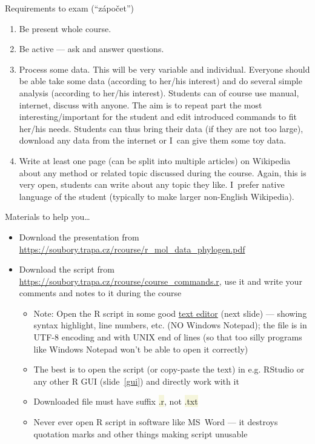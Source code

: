 \documentclass[compress, ucs, xelatex, 11pt, xcolor=svgnames, aspectratio=169,
	hyperref={
		bookmarks=true,
		unicode=true,
		colorlinks=true,
		pdftitle={Molecular data in R},
		plainpages=false,
		pdfauthor={Vojtech Zeisek},
		pdfsubject={Course about phylogeny and evolution in R},
		pdfcreator={XeLaTeX},
		pdfkeywords={R, evolution, phylogeny, molecular data},
		linkcolor=Crimson, %
		anchorcolor=Magenta, %
		citecolor=Magenta, %
		filecolor=Magenta, %
		menucolor=Magenta, %
		urlcolor=DodgerBlue, %
		pdftex},
	url={hyphens, lowtilde} %
	]{beamer}
\renewcommand{\texttt}[1]{\colorbox{Beige}{{\ttfamily #1}}}
\begin{document}
\begin{frame}{Requirements to exam (\enquote{zápočet})}
	\begin{enumerate}
		\item Be present whole course.
		\item Be active --- ask and answer questions.
		\item Process some data. This will be very variable and individual. Everyone should be able take some data (according to her/his interest) and do several simple analysis (according to her/his interest). Students can of course use manual, internet, discuss with anyone. The aim is to repeat part the most interesting/important for the student and edit introduced commands to fit her/his needs. Students can thus bring their data (if they are not too large), download any data from the internet or I~can give them some toy data.
		\item Write at least one page (can be split into multiple articles) on Wikipedia about any method or related topic discussed during the course. Again, this is very open, students can write about any topic they like. I~prefer native language of the student (typically to make larger non-English Wikipedia).
	\end{enumerate}
\end{frame}

\begin{frame}{Materials to help you\ldots}
	\begin{itemize}
		\item Download the presentation from \url{https://soubory.trapa.cz/rcourse/r_mol_data_phylogen.pdf}
		\item Download the script from \url{https://soubory.trapa.cz/rcourse/course_commands.r}, use it and write your comments and notes to it during the course
		\begin{itemize}
			\item \alert{Note:} Open the R script in some \alert{good} \href{http://texteditors.org/cgi-bin/wiki.pl?PickingATextEditor}{text editor} (next slide) --- showing syntax highlight, line numbers, etc. (\alert{NO} Windows Notepad); the file is in UTF-8 encoding and with UNIX end of lines (so that too silly programs like Windows Notepad won't be able to open it correctly)
			\item The best is to open the script (or copy-paste the text) in e.g. RStudio or any other R GUI (slide~\ref{gui}) and directly work with it
			\item \alert{Downloaded file must have suffix \texttt{*.r}, not \texttt{*.txt}}
			\item \alert{Never ever} open R script in software like MS~Word --- it destroys quotation marks and other things making script unusable
		\end{itemize}
	\end{itemize}
\end{frame}
\end{document}
